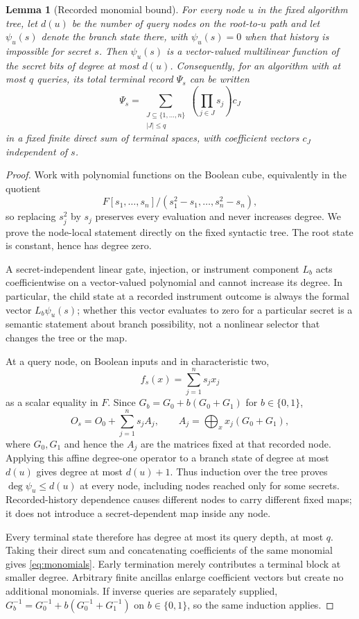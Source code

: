 \documentclass[11pt]{article}
\newtheorem{lemma}[theorem]{Lemma}
\begin{document}
\begin{lemma}[Recorded monomial bound]\label{lem:degree}
For every node $u$ in the fixed algorithm tree, let $d(u)$ be the number of query nodes on the root-to-$u$ path and let $\psi_u(s)$ denote the branch state there, with $\psi_u(s)=0$ when that history is impossible for secret $s$. Then $\psi_u(s)$ is a vector-valued multilinear function of the secret bits of degree at most $d(u)$. Consequently, for an algorithm with at most $q$ queries, its total terminal record $\Psi_s$ can be written
\begin{equation}\label{eq:monomials}
 \Psi_s=\sum_{\substack{J\subseteq\{1,\ldots,n\}\\|J|\le q}}
       \left(\prod_{j\in J}s_j\right)c_J
\end{equation}
in a fixed finite direct sum of terminal spaces, with coefficient vectors $c_J$ independent of $s$.
\end{lemma}
\begin{proof}
Work with polynomial functions on the Boolean cube, equivalently in the quotient
\[
 F[s_1,\ldots,s_n]/(s_1^2-s_1,\ldots,s_n^2-s_n),
\]
so replacing $s_j^2$ by $s_j$ preserves every evaluation and never increases degree. We prove the node-local statement directly on the fixed syntactic tree. The root state is constant, hence has degree zero.

A secret-independent linear gate, injection, or instrument component $L_b$ acts coefficientwise on a vector-valued polynomial and cannot increase its degree. In particular, the child state at a recorded instrument outcome is always the formal vector $L_b\psi_u(s)$; whether this vector evaluates to zero for a particular secret is a semantic statement about branch possibility, not a nonlinear selector that changes the tree or the map.

At a query node, on Boolean inputs and in characteristic two,
\[
 f_s(x)=\sum_{j=1}^n s_jx_j
\]
as a scalar equality in $F$. Since $G_b=G_0+b(G_0+G_1)$ for $b\in\{0,1\}$,
\[
 O_s=O_0+\sum_{j=1}^n s_jA_j,
 \qquad A_j=\bigoplus_x x_j(G_0+G_1),
\]
where $G_0,G_1$ and hence the $A_j$ are the matrices fixed at that recorded node. Applying this affine degree-one operator to a branch state of degree at most $d(u)$ gives degree at most $d(u)+1$. Thus induction over the tree proves $\deg \psi_u\le d(u)$ at every node, including nodes reached only for some secrets. Recorded-history dependence causes different nodes to carry different fixed maps; it does not introduce a secret-dependent map inside any node.

Every terminal state therefore has degree at most its query depth, at most $q$. Taking their direct sum and concatenating coefficients of the same monomial gives \eqref{eq:monomials}. Early termination merely contributes a terminal block at smaller degree. Arbitrary finite ancillas enlarge coefficient vectors but create no additional monomials. If inverse queries are separately supplied, $G_b^{-1}=G_0^{-1}+b(G_0^{-1}+G_1^{-1})$ on $b\in\{0,1\}$, so the same induction applies.
\end{proof}
\end{document}

